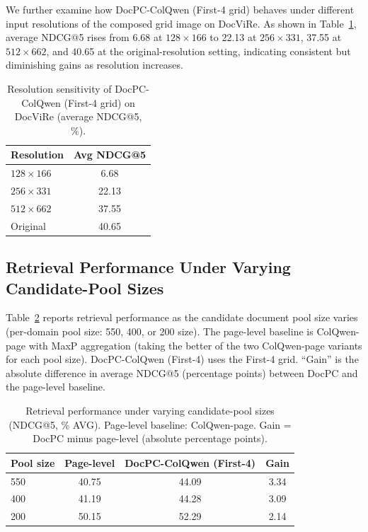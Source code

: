 We further examine how DocPC-ColQwen (First-4 grid) behaves under different input resolutions of the composed grid image on DocViRe. As shown in Table~\ref{tab:app-a7b}, average NDCG@5 rises from 6.68 at $128{\times}166$ to 22.13 at $256{\times}331$, 37.55 at $512{\times}662$, and 40.65 at the original-resolution setting, indicating consistent but diminishing gains as resolution increases.

\begin{table}[htbp]
  \centering
  \footnotesize
  \caption{Resolution sensitivity of DocPC-ColQwen (First-4 grid) on DocViRe (average NDCG@5, \%).}
  \label{tab:app-a7b}
  \begin{tabular}{@{}lc@{}}
    \toprule
    Resolution & Avg NDCG@5 \\
    \midrule
    $128{\times}166$ & 6.68 \\
    $256{\times}331$ & 22.13 \\
    $512{\times}662$ & 37.55 \\
    Original         & 40.65 \\
    \bottomrule
  \end{tabular}
\end{table}

\subsection{Retrieval Performance Under Varying Candidate-Pool Sizes}
\label{sec:app-a5}

Table~\ref{tab:app-a8} reports retrieval performance as the candidate document pool size varies (per-domain pool size: 550, 400, or 200 size). The page-level baseline is ColQwen-page with MaxP aggregation (taking the better of the two ColQwen-page variants for each pool size). DocPC-ColQwen (First-4) uses the First-4 grid. ``Gain'' is the absolute difference in average NDCG@5 (percentage points) between DocPC and the page-level baseline.

\begin{table}[htbp]
  \centering
  \footnotesize
  \caption{Retrieval performance under varying candidate-pool sizes (NDCG@5, \% AVG). Page-level baseline: ColQwen-page. Gain = DocPC minus page-level (absolute percentage points).}
  \label{tab:app-a8}
  \begin{tabular}{@{}lccc@{}}
    \toprule
    Pool size & Page-level & DocPC-ColQwen (First-4) & Gain \\
    \midrule
    550 & 40.75 & 44.09 & 3.34 \\
    400 & 41.19 & 44.28 & 3.09 \\
    200 & 50.15 & 52.29 & 2.14 \\
    \bottomrule
  \end{tabular}
\end{table}

